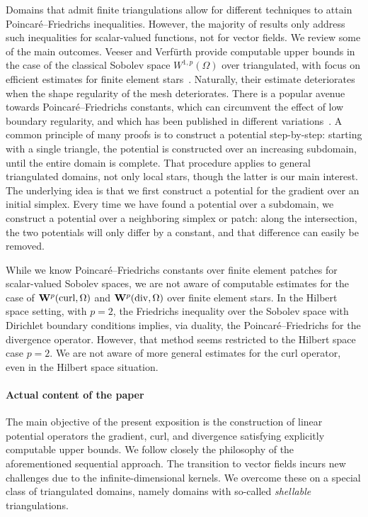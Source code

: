 \documentclass[a4paper]{article}
\begin{document}
Domains that admit finite triangulations allow for different techniques to attain Poincar\'e--Friedrichs inequalities. 
However, the majority of results only address such inequalities for scalar-valued functions, not for vector fields. 
We review some of the main outcomes. 
Veeser and Verfürth provide computable upper bounds in the case of the classical Sobolev space $W^{1,p}(\Omega)$ over triangulated, with focus on efficient estimates for finite element stars~\cite{veeser2012poincare}. Naturally, their estimate deteriorates when the shape regularity of the mesh deteriorates. 
% 
There is a popular avenue towards Poincar\'e--Friedrichs constants, which can circumvent the effect of low boundary regularity, 
and which has been published in different variations~\cite{vohralik2005discrete,ern2021finite}. 
A common principle of many proofs is to construct a potential step-by-step: 
starting with a single triangle, the potential is constructed over an increasing subdomain, until the entire domain is complete. That procedure applies to general triangulated domains, not only local stars, though the latter is our main interest. 
The underlying idea is that we first construct a potential for the gradient over an initial simplex. 
Every time we have found a potential over a subdomain, we construct a potential over a neighboring simplex or patch:
along the intersection, the two potentials will only differ by a constant, 
and that difference can easily be removed. 


While we know Poincar\'e--Friedrichs constants over finite element patches for scalar-valued Sobolev spaces, 
we are not aware of computable estimates for the case of ${\mathbf W}^{p}(\operatorname{curl},\Omega)$ and ${\mathbf W}^{p}(\operatorname{div},\Omega)$ over finite element stars. 
In the Hilbert space setting, with $p=2$, the Friedrichs inequality over the Sobolev space with Dirichlet boundary conditions implies, via duality, the Poincar\'e--Friedrichs for the divergence operator. However, that method seems restricted to the Hilbert space case $p=2$. 
We are not aware of more general estimates for the curl operator, even in the Hilbert space situation. 
\\


\paragraph{Actual content of the paper}
The main objective of the present exposition is the construction of linear potential operators the gradient, curl, and divergence satisfying explicitly computable upper bounds. We follow closely the philosophy of the aforementioned sequential approach. The transition to vector fields incurs new challenges due to the infinite-dimensional kernels. We overcome these on a special class of triangulated domains, namely domains with so-called \emph{shellable} triangulations. 
\\
\end{document}
